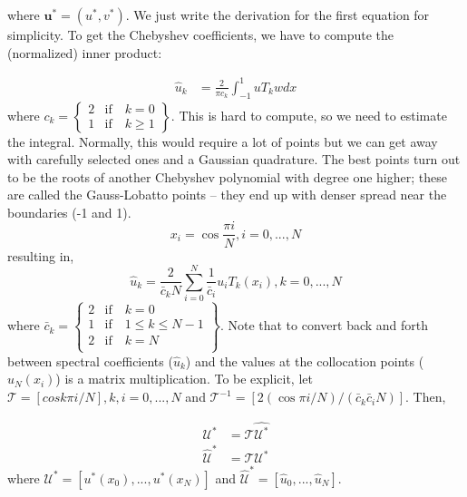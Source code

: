 \documentclass[12pt]{article}
\begin{document}
where $\mathbf{u}^* = (u^*, v^*)$. We just write the derivation for the first equation for simplicity. To get the Chebyshev coefficients, we have to compute the (normalized) inner product:

\begin{align*}
    \hat{u}_k &= \frac{2}{\pi c_k} \int_{-1}^1 u T_k w dx
\end{align*}
where $c_k = \left\{\begin{matrix}
2 &  \text{if} \quad k = 0\\
1 &  \text{if} \quad k \geq 1
\end{matrix}\right\}$. This is hard to compute, so we need to estimate the integral. Normally, this would require a lot of points but we can get away with carefully selected ones and a Gaussian quadrature. The best points turn out to be the roots of another Chebyshev polynomial with degree one higher; these are called the Gauss-Lobatto points -- they end up with denser spread near the boundaries (-1 and 1).
\begin{equation}
    x_i = \cos \frac{\pi i}{N}, i = 0, ..., N
\end{equation}
resulting in,
\begin{equation}
    \hat{u}_k = \frac{2}{\bar{c}_k N} \sum_{i=0}^N \frac{1}{\bar{c}_i} u_i T_k(x_i), k = 0, ..., N
\end{equation}
where $\bar{c}_k = \left\{\begin{matrix}
2 &  \text{if} \quad k = 0 \\
1 &  \text{if} \quad 1 \leq k \leq N - 1 \\
2 &  \text{if} \quad k = N \\
\end{matrix}\right\}$. Note that to convert back and forth between spectral coefficients ($\hat{u}_k$) and the values at the collocation points ($u_N(x_i)$) is a matrix multiplication. To be explicit, let
$\mathcal{T} = [cos k\pi i / N], k, i = 0, ..., N$ and $\mathcal{T}^{-1} = [2(\cos \pi i / N) / (\bar{c}_k \bar{c}_i N)]$. Then,

\begin{align*}
    \mathcal{U}^* &= \mathcal{T}\hat{\mathcal{U}^*} \\
    \hat{\mathcal{U}}^* &= \mathcal{T}\mathcal{U}^*
\end{align*}
where $\mathcal{U}^* = [u^*(x_0), ..., u^*(x_N)]$ and $\hat{\mathcal{U}}^* = [\hat{u}_0, ..., \hat{u}_N]$.
\end{document}
